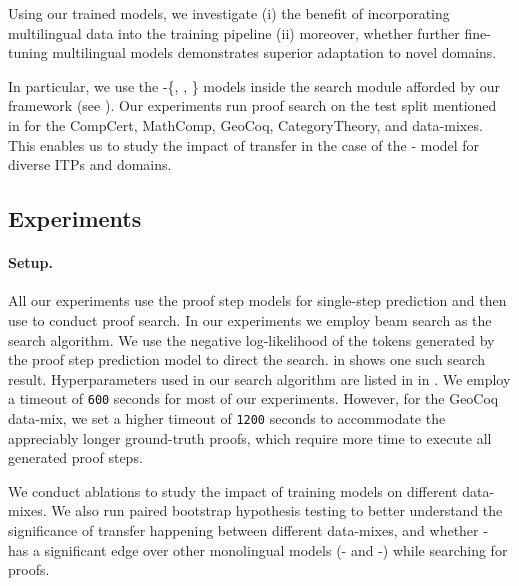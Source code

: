 \newcommand{\cmark}{\ding{51}}%
\newcommand{\xmark}{\ding{55}}%
\newcommand{\codetfive}[0]{\textsc{CodeT5}}
\newcommand{\greencheck}{\color{green}{\checkmark}}
\newcommand{\redcross}{\color{red}{\xmark}}
 
Using our trained \proofwala{} models, we investigate (i) the benefit of incorporating multilingual data into the training pipeline (ii) moreover, whether further fine-tuning multilingual models demonstrates superior adaptation to novel domains.

In particular, we use the \proofwala-\{\multi, \coq, \lean\} models inside the search module afforded by our framework (see ). Our experiments run proof search on the test split mentioned in  for the CompCert, MathComp, GeoCoq, CategoryTheory, and \lean data-mixes. This enables us to study the impact of transfer in the case of the \proofwala-\multi\; model for diverse ITPs and domains.

\subsection{Experiments}
\label{sec:experiments}

\paragraph{Setup.} 
All our experiments use the \proofwala\; proof step models for single-step prediction and then use \proofwala\; to conduct proof search. In our experiments we employ beam search as the search algorithm. We use the negative log-likelihood of the tokens generated by the \proofwala{} proof step prediction model to direct the search.  in  shows one such search result. Hyperparameters used in our search algorithm are listed in  in . We employ a timeout of \texttt{600} seconds for most of our experiments. However, for the GeoCoq data-mix, we set a higher timeout of \texttt{1200} seconds to accommodate the appreciably longer ground-truth proofs, which require more time to execute all generated proof steps.

We conduct ablations to study the impact of training \proofwala{} models on different data-mixes. We also run paired bootstrap hypothesis testing to better understand the significance of transfer happening between different data-mixes, and whether \proofwala-\multi{} has a significant edge over other monolingual models (\proofwala-\coq{} and \proofwala-\lean) while searching for proofs.

